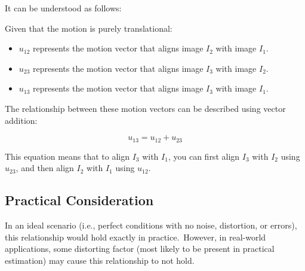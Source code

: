 \documentclass[12pt]{article}
\begin{document}
    \vspace{-5pt}

    It can be understood as follows:

    Given that the motion is purely translational:

    \vspace{-10pt}

    \begin{itemize}[itemsep=-0.25em]
        \item $u_{12}$ represents the motion vector that aligns image $I_2$ with image $I_1$.
        \item $u_{23}$ represents the motion vector that aligns image $I_3$ with image $I_2$.
        \item $u_{13}$ represents the motion vector that aligns image $I_3$ with image $I_1$.
    \end{itemize}

    \vspace{-9pt}

    The relationship between these motion vectors can be described using vector addition:

    \vspace{-10pt}

    \[
    u_{13} = u_{12} + u_{23}
    \]

    This equation means that to align $I_3$ with $I_1$, you can first align $I_3$ with $I_2$ using $u_{23}$, and then align $I_2$ with $I_1$ using $u_{12}$.

    \vspace{-10pt}

    \subsection*{Practical Consideration}

    \vspace{-5pt}

    In an ideal scenario (i.e., perfect conditions with no noise, distortion, or errors), this relationship would hold exactly in practice.\ However, in real-world applications, some distorting factor (most likely to be present in practical estimation) may cause this relationship to not hold.

    \vspace{-10pt}
\end{document}
